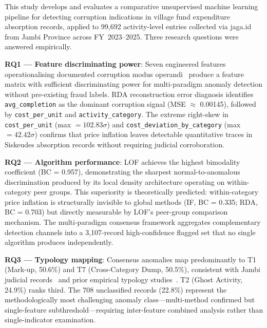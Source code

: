 \documentclass[3p,times,procedia]{elsarticle}
\begin{document}
This study develops and evaluates a comparative unsupervised machine learning pipeline for detecting corruption indications in village fund expenditure absorption records, applied to 99,692 activity-level entries collected via jaga.id from Jambi Province across FY~2023--2025. Three research questions were answered empirically.

\textbf{RQ1 --- Feature discriminating power}: Seven engineered features operationalising documented corruption modus operandi~\cite{ref13,ref14} produce a feature matrix with sufficient discriminating power for multi-paradigm anomaly detection without pre-existing fraud labels. RDA reconstruction error diagnosis identifies \texttt{avg\_completion} as the dominant corruption signal (MSE $\approx$ 0.00145), followed by \texttt{cost\_per\_unit} and \texttt{activity\_category}. The extreme right-skew in \texttt{cost\_per\_unit} (max $= 102.83\sigma$) and \texttt{cost\_deviation\_by\_category} (max $= 42.42\sigma$) confirms that price inflation leaves detectable quantitative traces in Siskeudes absorption records without requiring judicial corroboration.

\textbf{RQ2 --- Algorithm performance}: LOF achieves the highest bimodality coefficient (BC = 0.957), demonstrating the sharpest normal-to-anomalous discrimination produced by its local density architecture operating on within-category peer groups. This superiority is theoretically predicted: within-category price inflation is structurally invisible to global methods (IF, BC = 0.335; RDA, BC = 0.703) but directly measurable by LOF's peer-group comparison mechanism. The multi-paradigm consensus framework aggregates complementary detection channels into a 3,107-record high-confidence flagged set that no single algorithm produces independently.

\textbf{RQ3 --- Typology mapping}: Consensus anomalies map predominantly to T1 (Mark-up, 50.6\%) and T7 (Cross-Category Dump, 50.5\%), consistent with Jambi judicial records~\cite{ref30,ref31,ref32,ref33} and prior empirical typology studies~\cite{ref13,ref14}. T2 (Ghost Activity, 24.9\%) ranks third. The 708 unclassified records (22.8\%) represent the methodologically most challenging anomaly class---multi-method confirmed but single-feature subthreshold---requiring inter-feature combined analysis rather than single-indicator examination.
\end{document}
